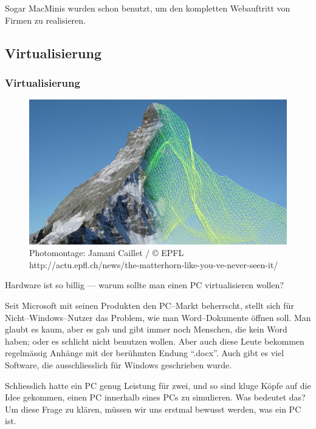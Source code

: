       Sogar MacMinis wurden schon benutzt, um den kompletten Webauftritt von Firmen zu realisieren.

    \subsection{Virtualisierung}
    \begin{frame}
      \frametitle<beamer>{Virtualisierung}
        \begin{figure}
          \includegraphics[width=1\textwidth]{pics/Matterhorn}
          \caption{Photomontage: Jamani Caillet / © EPFL\newline
          \hspace{\linewidth}http://actu.epfl.ch/news/the-matterhorn-like-you-ve-never-seen-it/}
        \end{figure}
    \end{frame}
      
      Hardware ist so billig --- warum sollte man einen PC virtualisieren wollen?

      Seit Microsoft mit seinen Produkten den PC--Markt beherrscht, stellt sich für Nicht--Windows--Nutzer das Problem, wie man Word--Dokumente öffnen soll. Man glaubt es kaum, aber es gab und gibt immer noch Menschen, die kein Word haben; oder es schlicht nicht benutzen wollen. Aber auch diese Leute bekommen regelmässig Anhänge mit der berühmten Endung ``.docx''. Auch gibt es viel Software, die ausschliesslich für Windows geschrieben wurde. 

      Schliesslich hatte ein PC genug Leistung für zwei, und so sind kluge Köpfe auf die Idee gekommen, einen PC innerhalb eines PCs zu simulieren. Was bedeutet das? Um diese Frage zu klären, müssen wir uns erstmal bewusst werden, was ein PC ist.

